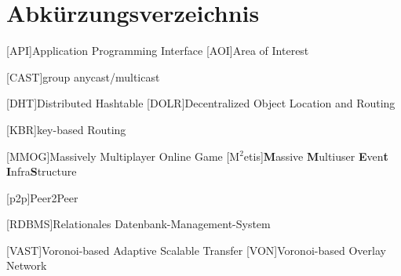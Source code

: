 \chapter*{Abkürzungsverzeichnis}

\pagestyle{useheadings}

\vspace{\topskip}


\begin{acronym}[xxxxxxxxxxxx]
	\setlength{\itemsep}{-\parsep}
	\setlength{\itemindent}{1.5em}
	[API]{Application Programming Interface}
	[AOI]{Area of Interest}

	\vspace{\parsep} 
 [CAST]{group anycast/multicast}

	\vspace{\parsep}
	 [DHT]{Distributed Hashtable}
	[DOLR]{Decentralized Object Location and Routing}



	
	
\vspace{\parsep}
[KBR]{key-based Routing}




	\vspace{\parsep}
	[MMOG]{Massively Multiplayer Online Game}
	[M$^2$etis]{\textbf{M}assive \textbf{M}ultiuser \textbf{E}ven\textbf{t} \textbf{I}nfra\textbf{S}tructure}

	
	\vspace{\parsep}
	[p2p]{Peer2Peer}

	

	[RDBMS]{Relationales Datenbank-Management-System}
	
	


	\vspace{\parsep}
	[VAST]{Voronoi-based Adaptive Scalable Transfer}
	[VON]{Voronoi-based Overlay Network}





\end{acronym}
